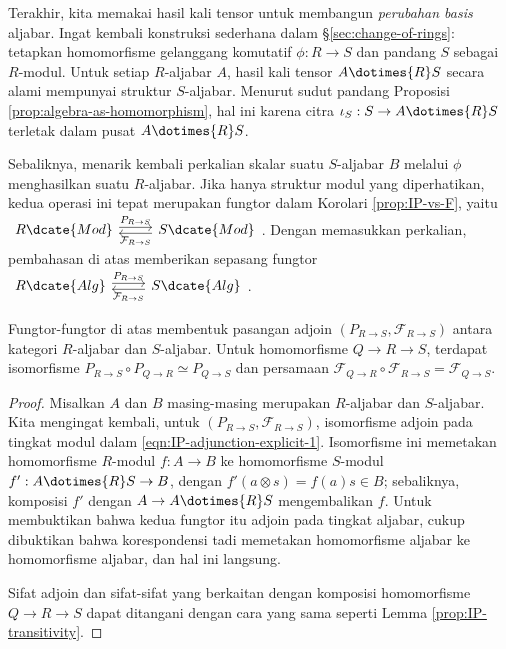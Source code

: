 Terakhir, kita memakai hasil kali tensor untuk membangun \emph{perubahan basis} aljabar. Ingat kembali konstruksi sederhana dalam \S\ref{sec:change-of-rings}: tetapkan homomorfisme gelanggang komutatif $\phi: R \to S$ dan pandang $S$ sebagai $R$-modul. Untuk setiap $R$-aljabar $A$, hasil kali tensor $A \dotimes{R} S$ secara alami mempunyai struktur $S$-aljabar. Menurut sudut pandang Proposisi \ref{prop:algebra-as-homomorphism}, hal ini karena citra $\iota_S: S \to A \dotimes{R} S$ terletak dalam pusat $A \dotimes{R} S$. %

Sebaliknya, menarik kembali perkalian skalar suatu $S$-aljabar $B$ melalui $\phi$ menghasilkan suatu $R$-aljabar. Jika hanya struktur modul yang diperhatikan, kedua operasi ini tepat merupakan fungtor dalam Korolari \ref{prop:IP-vs-F}, yaitu $\begin{tikzcd} R\dcate{Mod} \arrow[r, yshift=0.5ex, "{P_{R \to S}}"] & S\dcate{Mod} \arrow[l, yshift=-0.5ex, "{\mathcal{F}_{R \to S}}"] \end{tikzcd}$. Dengan memasukkan perkalian, pembahasan di atas memberikan sepasang fungtor $\begin{tikzcd} R\dcate{Alg} \arrow[r, yshift=0.5ex, "{P_{R \to S}}"] & S\dcate{Alg} \arrow[l, yshift=-0.5ex, "{\mathcal{F}_{R \to S}}"] \end{tikzcd}$.

\begin{proposition}\label{prop:IP-vs-F-alg}
	Fungtor-fungtor di atas membentuk pasangan adjoin $(P_{R \to S}, \mathcal{F}_{R \to S})$ antara kategori $R$-aljabar dan $S$-aljabar. Untuk homomorfisme $Q \to R \to S$, terdapat isomorfisme $P_{R \to S} \circ P_{Q \to R} \simeq P_{Q \to S}$ dan persamaan $\mathcal{F}_{Q \to R} \circ \mathcal{F}_{R \to S} = \mathcal{F}_{Q \to S}$.
\end{proposition}
\begin{proof}
	Misalkan $A$ dan $B$ masing-masing merupakan $R$-aljabar dan $S$-aljabar.	Kita mengingat kembali, untuk $(P_{R \to S}, \mathcal{F}_{R \to S})$, isomorfisme adjoin pada tingkat modul dalam \eqref{eqn:IP-adjunction-explicit-1}. Isomorfisme ini memetakan homomorfisme $R$-modul $f: A \to B$ ke homomorfisme $S$-modul $f': A \dotimes{R} S \to B$, dengan $f'(a \otimes s) = f(a)s \in B$; sebaliknya, komposisi $f'$ dengan $A \to A \dotimes{R} S$ mengembalikan $f$. Untuk membuktikan bahwa kedua fungtor itu adjoin pada tingkat aljabar, cukup dibuktikan bahwa korespondensi tadi memetakan homomorfisme aljabar ke homomorfisme aljabar, dan hal ini langsung.
	
	Sifat adjoin dan sifat-sifat yang berkaitan dengan komposisi homomorfisme $Q \to R \to S$ dapat ditangani dengan cara yang sama seperti Lemma \ref{prop:IP-transitivity}.
\end{proof}

